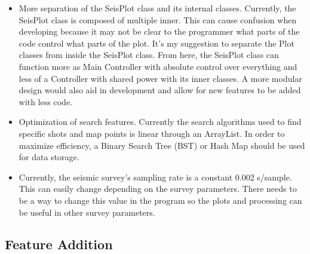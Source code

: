 \documentclass[12pt]{article}
\begin{document}
\begin{itemize}
\item More separation of the SeisPlot class and its internal classes. Currently, the SeisPlot class is composed of multiple inner. This can cause confusion when developing because it may not be clear to the programmer what parts of the code control what parts of the plot. It's my suggestion to separate the Plot classes from inside the SeisPlot class. From here, the SeisPlot class can function more as Main Controller with absolute control over everything and less of a Controller with shared power with its inner classes. A more modular design would also aid in development and allow for new features to be added with less code.

\item Optimization of search features. Currently the search algorithms used to find specific shots and map points is linear through an ArrayList. In order to maximize efficiency, a Binary Search Tree (BST) or Hash Map should be used for data storage.

\item Currently, the seismic survey's sampling rate is a constant 0.002 s/sample. This can easily change depending on the survey parameters. There needs to be a way to change this value in the program so the plots and processing can be useful in other survey parameters.
\end{itemize}

\subsection{Feature Addition}
\end{document}

